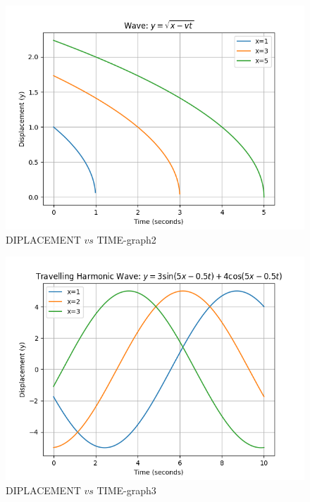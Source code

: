 \documentclass[journal,12pt,twocolumn]{IEEEtran}
\theoremstyle{remark}
\begin{document}
\begin{figure}[ht]
                            \centering
                            \includegraphics[width=\columnwidth]{ncert-physics/11.15.13/figs/b.png}
                            \caption{DIPLACEMENT $vs$ TIME-graph2}
                            \label{fig:2}
\end{figure}   
\begin{figure}[ht]
                             \centering
                             \includegraphics[width=\columnwidth]{ncert-physics/11.15.13/figs/c.png}
                             \caption{DIPLACEMENT $vs$ TIME-graph3}
                             \label{fig:3}
\end{figure}
\end{document}
